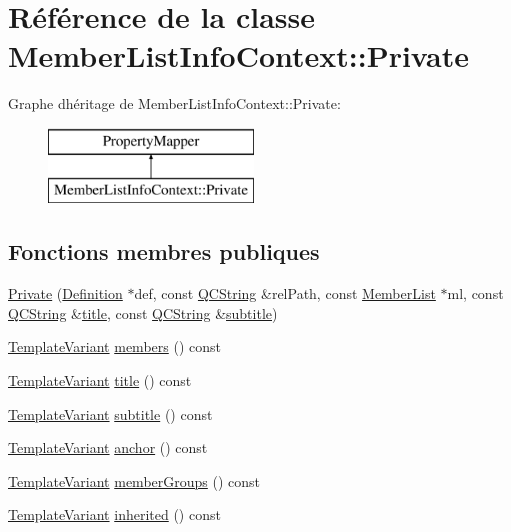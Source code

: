 \hypertarget{class_member_list_info_context_1_1_private}{}\section{Référence de la classe Member\+List\+Info\+Context\+:\+:Private}
\label{class_member_list_info_context_1_1_private}
Graphe d\textquotesingle{}héritage de Member\+List\+Info\+Context\+:\+:Private\+:\begin{figure}[H]
\begin{center}
\leavevmode
\includegraphics[height=2.000000cm]{class_member_list_info_context_1_1_private}
\end{center}
\end{figure}
\subsection*{Fonctions membres publiques}
\begin{DoxyCompactItemize}
\item 
\hyperlink{class_member_list_info_context_1_1_private_a80904139878505daff26adfabcd5f015}{Private} (\hyperlink{class_definition}{Definition} $\ast$def, const \hyperlink{class_q_c_string}{Q\+C\+String} \&rel\+Path, const \hyperlink{class_member_list}{Member\+List} $\ast$ml, const \hyperlink{class_q_c_string}{Q\+C\+String} \&\hyperlink{class_member_list_info_context_1_1_private_af4c454223334881fab17d171081f8d54}{title}, const \hyperlink{class_q_c_string}{Q\+C\+String} \&\hyperlink{class_member_list_info_context_1_1_private_a078366222f541daaec21f11b23a37ee3}{subtitle})
\item 
\hyperlink{class_template_variant}{Template\+Variant} \hyperlink{class_member_list_info_context_1_1_private_ac0844b46341f37086882db86d0c79858}{members} () const 
\item 
\hyperlink{class_template_variant}{Template\+Variant} \hyperlink{class_member_list_info_context_1_1_private_af4c454223334881fab17d171081f8d54}{title} () const 
\item 
\hyperlink{class_template_variant}{Template\+Variant} \hyperlink{class_member_list_info_context_1_1_private_a078366222f541daaec21f11b23a37ee3}{subtitle} () const 
\item 
\hyperlink{class_template_variant}{Template\+Variant} \hyperlink{class_member_list_info_context_1_1_private_aa30b9597c2219b738327b3eb773f2c26}{anchor} () const 
\item 
\hyperlink{class_template_variant}{Template\+Variant} \hyperlink{class_member_list_info_context_1_1_private_a6ffc1cec6bd701324edc604c39c96f66}{member\+Groups} () const 
\item 
\hyperlink{class_template_variant}{Template\+Variant} \hyperlink{class_member_list_info_context_1_1_private_ab15555be20a441c05e021a32a795dca9}{inherited} () const 
\end{DoxyCompactItemize}


